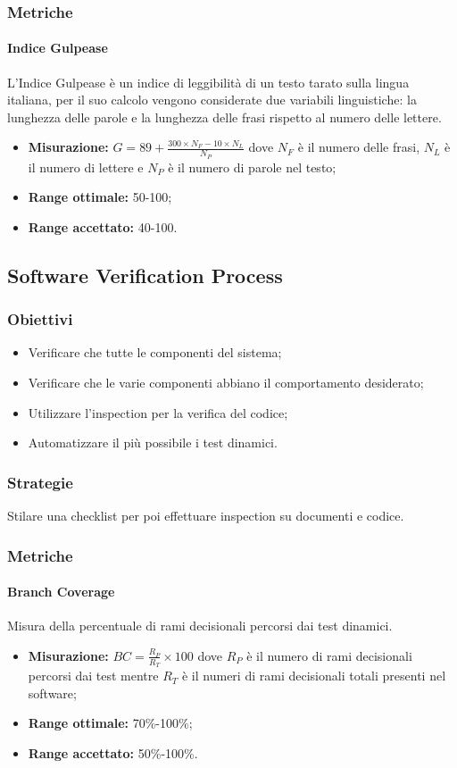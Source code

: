 		\subsubsection{Metriche}
			\paragraph{Indice Gulpease} \Spazio
			L'Indice Gulpease è un indice di leggibilità di un testo tarato sulla lingua italiana, per il suo calcolo vengono considerate due variabili linguistiche: la lunghezza delle parole e la lunghezza delle frasi rispetto al numero delle lettere.
			\begin{itemize}
				\item \textbf{Misurazione:} $G=89+\frac{300\times N_F-10\times N_L}{N_P}$ dove $N_F$ è il numero delle frasi, $N_L$ è il numero di lettere e $N_P$ è il numero di parole nel testo;
				\item \textbf{Range ottimale:} 50-100;
				\item \textbf{Range accettato:} 40-100.
			\end{itemize}

	\subsection{Software Verification Process}
		\subsubsection{Obiettivi}
		\begin{itemize}
			\item Verificare che tutte le componenti del sistema;
			\item Verificare che le varie componenti abbiano il comportamento desiderato;
			\item Utilizzare l'inspection per la verifica del codice;
			\item Automatizzare il più possibile i test dinamici.
		\end{itemize}
		\subsubsection{Strategie}
		Stilare una checklist per poi effettuare inspection su documenti e codice.
		\subsubsection{Metriche}
			\paragraph{Branch Coverage}  \Spazio
			Misura della percentuale di rami decisionali percorsi dai test dinamici.
			\begin{itemize}
				\item \textbf{Misurazione:} $BC=\frac{R_P}{R_T}\times 100$ dove $R_P$ è il numero di rami decisionali percorsi dai test mentre $R_T$ è il numeri di rami decisionali totali presenti nel software;
				\item \textbf{Range ottimale:} 70\%-100\%;
				\item \textbf{Range accettato:} 50\%-100\%.
		    \end{itemize}

